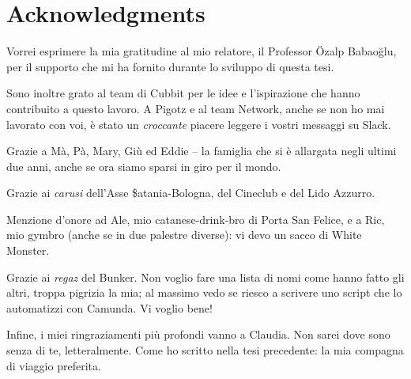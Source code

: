 \shipout\null
\chapter*{Acknowledgments}

Vorrei esprimere la mia gratitudine al mio relatore, il Professor Özalp Babaoğlu, per il supporto che mi ha fornito durante lo sviluppo di questa tesi.

Sono inoltre grato al team di Cubbit per le idee e l'ispirazione che hanno
contribuito a questo lavoro. A Pigotz e al team Network, anche se non ho mai
lavorato con voi, è stato un \emph{croccante} piacere leggere i vostri messaggi su Slack.

Grazie a Mà, Pà, Mary, Giù ed Eddie -- la famiglia che si è allargata negli ultimi due anni, anche se ora siamo sparsi in giro per il mondo.

Grazie ai \emph{carusi} dell'Asse \$atania-Bologna, del Cineclub e del Lido Azzurro.

Menzione d'onore ad Ale, mio catanese-drink-bro di Porta San Felice, e a Ric, mio gymbro (anche se in due palestre diverse): vi devo un sacco di White Monster.

Grazie ai \emph{regaz} del Bunker. Non voglio fare una lista di nomi come hanno fatto gli
altri, troppa pigrizia la mia; al massimo vedo se riesco a scrivere uno script che lo
automatizzi con Camunda. Vi voglio bene!

Infine, i miei ringraziamenti più profondi vanno a Claudia. Non sarei dove sono
senza di te, letteralmente. Come ho scritto nella tesi precedente: la mia compagna di viaggio preferita.
